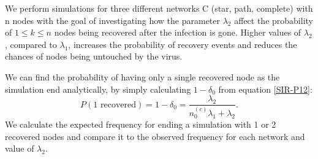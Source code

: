 \documentclass[12pt]{article} %
\numberwithin{equation}{section}
\begin{document}
We perform simulations for three different networks C (star, path, complete) with n nodes with the goal of investigating how the parameter $\lambda_2$ affect the probability of $1\leq k\leq n$ nodes being recovered after the infection is gone. Higher values of $\lambda_2$, compared to $\lambda_1$, increases the probability of recovery events and reduces the chances of nodes being untouched by the virus. 

We can find the probability of having only a single recovered node as the simulation end analytically, by simply calculating $1-\delta_0$ from equation \ref{SIR-P12}:
\begin{equation}\label{bara1}
    P(\text{1 recovered}) = 1-\delta_0 = \frac{\lambda_2}{n_0^{(c)}\lambda_1+\lambda_2}.
\end{equation}
We calculate the expected frequency for ending a simulation with 1 or 2 recovered nodes and compare it to the observed frequency for each network and value of $\lambda_2$.
\end{document}
